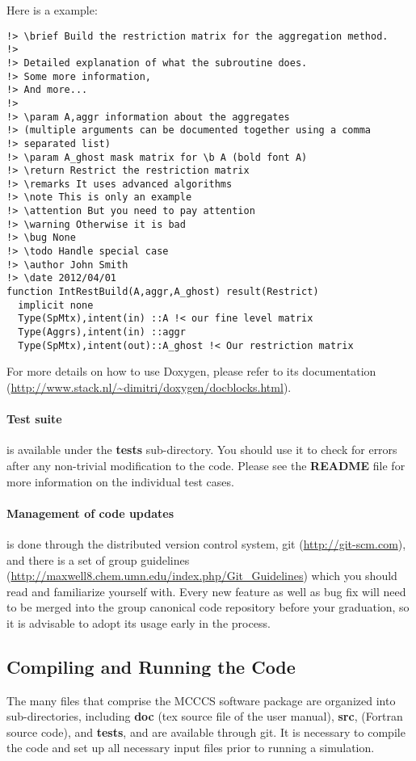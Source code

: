 \documentclass[12pt,letterpaper]{article}
\begin{document}
Here is a example:
\begin{verbatim}
!> \brief Build the restriction matrix for the aggregation method.
!>
!> Detailed explanation of what the subroutine does.
!> Some more information,
!> And more...
!>
!> \param A,aggr information about the aggregates
!> (multiple arguments can be documented together using a comma
!> separated list)
!> \param A_ghost mask matrix for \b A (bold font A)
!> \return Restrict the restriction matrix
!> \remarks It uses advanced algorithms
!> \note This is only an example
!> \attention But you need to pay attention
!> \warning Otherwise it is bad
!> \bug None
!> \todo Handle special case
!> \author John Smith
!> \date 2012/04/01
function IntRestBuild(A,aggr,A_ghost) result(Restrict)
  implicit none
  Type(SpMtx),intent(in) ::A !< our fine level matrix
  Type(Aggrs),intent(in) ::aggr
  Type(SpMtx),intent(out)::A_ghost !< Our restriction matrix
\end{verbatim}

For more details on how to use Doxygen, please refer to its documentation (\url{http://www.stack.nl/~dimitri/doxygen/docblocks.html}).

\paragraph{Test suite} is available under the {\bf tests} sub-directory. You should use it to check for errors after any non-trivial modification to the code. Please see the {\bf README} file for more information on the individual test cases.

\paragraph{Management of code updates} is done through the distributed version control system, git (\url{http://git-scm.com}), and there is a set of group guidelines (\url{http://maxwell8.chem.umn.edu/index.php/Git_Guidelines}) which you should read and familiarize yourself with. Every new feature as well as bug fix will need to be merged into the group canonical code repository before your graduation, so it is advisable to adopt its usage early in the process.

\subsection{Compiling and Running the Code}
\label{compile}
\noindent The many files that comprise the MCCCS software package are organized into sub-directories, including {\bf doc} (tex source file of the user manual), {\bf src}, (Fortran source code), and {\bf tests},  and are available through git.
It is necessary to compile the code and set up all necessary input files prior to running a simulation.
\end{document}

